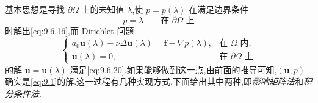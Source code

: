 基本思想是寻找 \(\partial\Omega\) 上的未知值 \(\lambda\),使 \(p=p(\lambda)\) 在满足边界条件
\begin{equation}\label{eq:9.6.21}
  p=\lambda\qquad\text{在 }\partial\Omega\text{ 上}
\end{equation}
时解出\eqref{eq:9.6.16},而 Dirichlet 问题
\begin{equation}\label{eq:9.6.22}
  \begin{cases}
    a_0\boldsymbol{u}(\lambda)-\nu\Delta\boldsymbol{u}(\lambda)
       =\boldsymbol{f}-\nabla p(\lambda),&\text{在 }\Omega\text{ 内},\\
    \boldsymbol{u}(\lambda)=0,&\text{在 }\partial\Omega\text{ 上}
  \end{cases}
\end{equation}
的解 \(\boldsymbol{u}=\boldsymbol{u}(\lambda)\) 满足\eqref{eq:9.6.20}.如果能够做到这一点,由前面的推导可知,\((\boldsymbol{u},p)\) 确实是\eqref{eq:9.1}的解.这一过程有几种实现方式.下面给出其中两种,即\emph{影响矩阵法}和\emph{积分条件法}.

